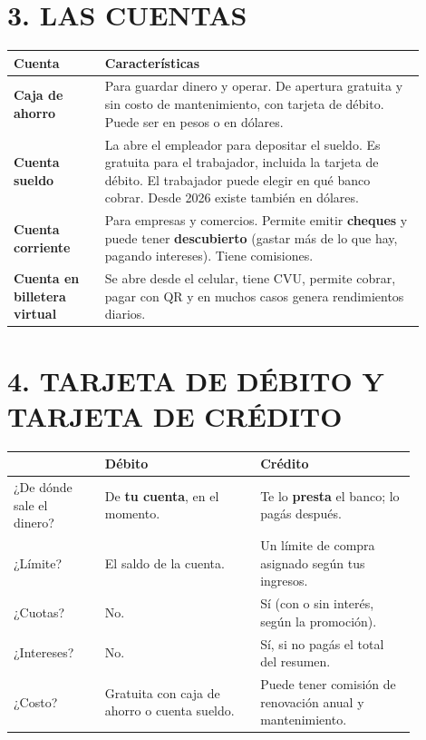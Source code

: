 \section*{3. LAS CUENTAS}

\begin{center}
\small
\begin{tabular}{|p{0.20\linewidth}|p{0.70\linewidth}|}
\hline
\textbf{Cuenta} & \textbf{Características} \\ \hline
\textbf{Caja de ahorro} & Para guardar dinero y operar. De apertura gratuita y sin costo de
mantenimiento, con tarjeta de débito. Puede ser en pesos o en dólares. \\ \hline
\textbf{Cuenta sueldo} & La abre el empleador para depositar el sueldo. Es gratuita para el
trabajador, incluida la tarjeta de débito. El trabajador puede elegir en qué banco cobrar.
Desde 2026 existe también en dólares. \\ \hline
\textbf{Cuenta corriente} & Para empresas y comercios. Permite emitir \textbf{cheques} y
puede tener \textbf{descubierto} (gastar más de lo que hay, pagando intereses). Tiene
comisiones. \\ \hline
\textbf{Cuenta en billetera virtual} & Se abre desde el celular, tiene CVU, permite cobrar,
pagar con QR y en muchos casos genera rendimientos diarios. \\ \hline
\end{tabular}
\end{center}

\section*{4. TARJETA DE DÉBITO Y TARJETA DE CRÉDITO}

\begin{center}
\small
\begin{tabular}{|p{0.20\linewidth}|p{0.34\linewidth}|p{0.34\linewidth}|}
\hline
 & \textbf{Débito} & \textbf{Crédito} \\ \hline
¿De dónde sale el dinero? & De \textbf{tu cuenta}, en el momento. & Te lo \textbf{presta} el
banco; lo pagás después. \\ \hline
¿Límite? & El saldo de la cuenta. & Un límite de compra asignado según tus ingresos. \\ \hline
¿Cuotas? & No. & Sí (con o sin interés, según la promoción). \\ \hline
¿Intereses? & No. & Sí, si no pagás el total del resumen. \\ \hline
¿Costo? & Gratuita con caja de ahorro o cuenta sueldo. & Puede tener comisión de renovación
anual y mantenimiento. \\ \hline
\end{tabular}
\end{center}

